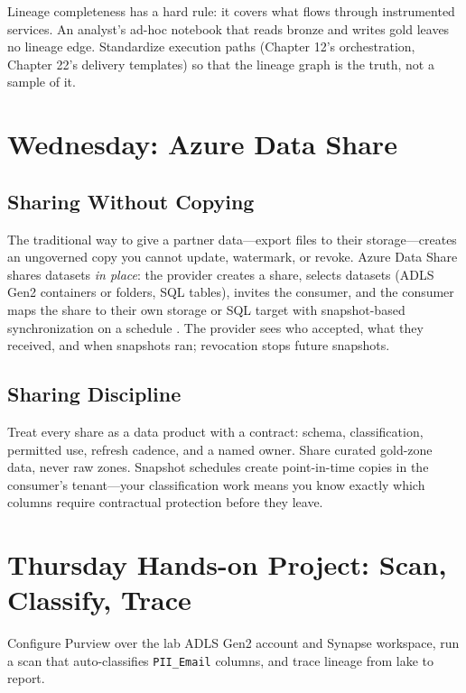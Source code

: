 Lineage completeness has a hard rule: it covers what flows through instrumented services. An analyst's ad-hoc notebook that reads bronze and writes gold leaves no lineage edge. Standardize execution paths (Chapter 12's orchestration, Chapter 22's delivery templates) so that the lineage graph is the truth, not a sample of it.

\section{Wednesday: Azure Data Share}

\subsection{Sharing Without Copying}
The traditional way to give a partner data---export files to their storage---creates an ungoverned copy you cannot update, watermark, or revoke. Azure Data Share shares datasets \emph{in place}: the provider creates a share, selects datasets (ADLS Gen2 containers or folders, SQL tables), invites the consumer, and the consumer maps the share to their own storage or SQL target with snapshot-based synchronization on a schedule \cite{microsoft2025dataShare}. The provider sees who accepted, what they received, and when snapshots ran; revocation stops future snapshots.

\subsection{Sharing Discipline}
Treat every share as a data product with a contract: schema, classification, permitted use, refresh cadence, and a named owner. Share curated gold-zone data, never raw zones. Snapshot schedules create point-in-time copies in the consumer's tenant---your classification work means you know exactly which columns require contractual protection before they leave.

\section{Thursday Hands-on Project: Scan, Classify, Trace}
Configure Purview over the lab ADLS Gen2 account and Synapse workspace, run a scan that auto-classifies \texttt{PII\_Email} columns, and trace lineage from lake to report.

